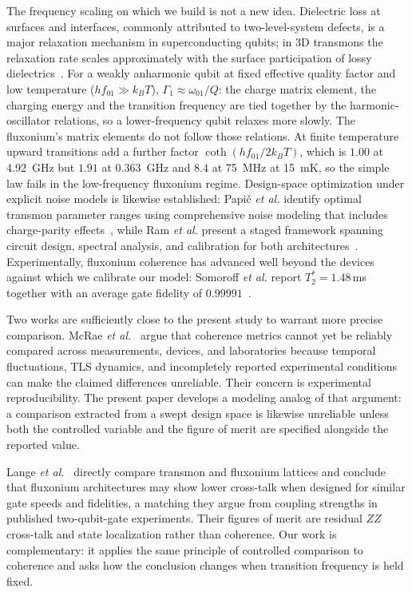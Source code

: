 \documentclass{SciPost}
\begin{document}
The frequency scaling on which we build is not a new idea. Dielectric loss at surfaces and
interfaces, commonly attributed to two-level-system defects, is a major relaxation mechanism in
superconducting qubits; in 3D transmons the relaxation rate scales approximately with the
surface participation of lossy dielectrics~\cite{wang2015}. For a weakly anharmonic qubit at fixed
effective quality factor and low temperature ($hf_{01}\gg k_BT$), $\Gamma_1\approx\omega_{01}/Q$:
the charge matrix element, the charging energy and the transition frequency are tied together by
the harmonic-oscillator relations, so a lower-frequency qubit relaxes more slowly. The
fluxonium's matrix elements do not follow those relations. At finite temperature upward
transitions add a further factor
$\coth(hf_{01}/2k_BT)$, which is $1.00$ at \SI{4.92}{\giga\hertz} but $1.91$ at
\SI{0.363}{\giga\hertz} and $8.4$ at \SI{75}{\mega\hertz} at \SI{15}{\milli\kelvin}, so the
simple law fails in the low-frequency fluxonium regime. Design-space optimization under explicit noise models
is likewise established: Papi\v{c} \emph{et al.} identify optimal transmon parameter ranges using
comprehensive noise modeling that includes charge-parity effects~\cite{papic2024}, while Ram
\emph{et al.} present a staged framework spanning circuit design, spectral analysis, and
calibration for both architectures~\cite{ram2025}. Experimentally, fluxonium coherence has
advanced well beyond the devices against which we calibrate our model: Somoroff \emph{et al.}
report $T_2^* = 1.48$\,ms together with an average gate fidelity of
$0.99991$~\cite{somoroff2023}.

Two works are sufficiently close to the present study to warrant more precise comparison.
McRae \emph{et al.}~\cite{mcrae2021} argue that coherence metrics cannot yet be reliably
compared across measurements, devices, and laboratories because temporal fluctuations, TLS
dynamics, and incompletely reported experimental conditions can make the claimed differences
unreliable. Their concern is experimental reproducibility. The present paper develops a modeling
analog of that argument: a comparison extracted from a swept design space is likewise
unreliable unless both the controlled variable and the figure of merit are specified alongside
the reported value.

Lange \emph{et al.}~\cite{lange2025} directly compare transmon and fluxonium lattices and
conclude that fluxonium architectures may show lower cross-talk when designed for similar gate
speeds and fidelities, a matching they argue from coupling strengths in published
two-qubit-gate experiments. Their figures of merit are residual $ZZ$ cross-talk and
state localization rather than coherence. Our work is complementary: it applies the same
principle of controlled comparison to coherence and asks how the conclusion changes when
transition frequency is held fixed.
\end{document}
